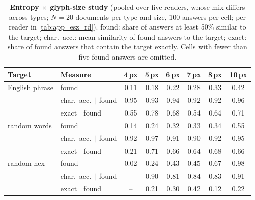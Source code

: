 \begin{table}[!htbp]
\centering
\caption{\textbf{Entropy $\times$ glyph-size study} (pooled over five readers, whose mix differs across types; $N{=}20$ documents per type and size, 100 answers per cell; per reader in \cref{tab:app_esz_rd}). found: share of answers at least 50\% similar to the target; char.\ acc.: mean similarity of found answers to the target; exact: share of found answers that contain the target exactly. Cells with fewer than five found answers are omitted.}
\label{tab:app_esz}
\footnotesize
\setlength{\tabcolsep}{3pt}
\begin{tabular}{l l cccccc}
\toprule
Target & Measure & 4\,px & 5\,px & 6\,px & 7\,px & 8\,px & 10\,px \\
\midrule
English phrase & found & 0.11 & 0.18 & 0.22 & 0.28 & 0.33 & 0.42 \\
 & char.\ acc.\ $|$ found & 0.95 & 0.93 & 0.94 & 0.92 & 0.92 & 0.96 \\
 & exact $|$ found & 0.55 & 0.78 & 0.68 & 0.54 & 0.64 & 0.71 \\
\midrule
random words & found & 0.14 & 0.24 & 0.32 & 0.33 & 0.34 & 0.55 \\
 & char.\ acc.\ $|$ found & 0.92 & 0.97 & 0.91 & 0.90 & 0.92 & 0.95 \\
 & exact $|$ found & 0.21 & 0.71 & 0.66 & 0.64 & 0.68 & 0.66 \\
\midrule
random hex & found & 0.02 & 0.24 & 0.43 & 0.45 & 0.67 & 0.98 \\
 & char.\ acc.\ $|$ found & -- & 0.90 & 0.81 & 0.84 & 0.83 & 0.91 \\
 & exact $|$ found & -- & 0.21 & 0.30 & 0.42 & 0.12 & 0.22 \\
\bottomrule
\end{tabular}
\end{table}
